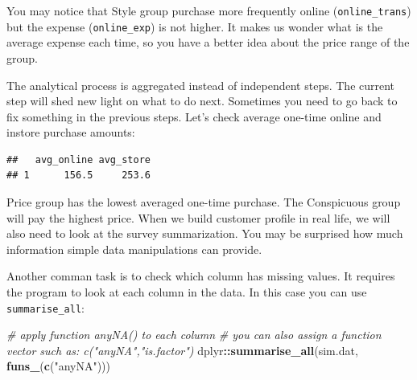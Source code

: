 \documentclass[12pt,]{krantz}
\makeatletter
\newenvironment{Shaded}{\begin{snugshade}}{\end{snugshade}}
\newcommand{\CommentTok}[1]{\textcolor[rgb]{0.37,0.37,0.37}{\textit{#1}}}
\newcommand{\DataTypeTok}[1]{\textcolor[rgb]{0.27,0.27,0.27}{#1}}
\newcommand{\DecValTok}[1]{\textcolor[rgb]{0.06,0.06,0.06}{#1}}
\newcommand{\KeywordTok}[1]{\textcolor[rgb]{0.27,0.27,0.27}{\textbf{#1}}}
\newcommand{\NormalTok}[1]{#1}
\newcommand{\OperatorTok}[1]{\textcolor[rgb]{0.43,0.43,0.43}{\textbf{#1}}}
\newcommand{\StringTok}[1]{\textcolor[rgb]{0.5,0.5,0.5}{#1}}
\newenvironment{kframe}{%
\medskip{}
\setlength{\fboxsep}{.8em}
 \def\at@end@of@kframe{}%
 \ifinner\ifhmode%
  \def\at@end@of@kframe{\end{minipage}}%
  \begin{minipage}{\columnwidth}%
 \fi\fi%
 \def\FrameCommand##1{\hskip\@totalleftmargin \hskip-\fboxsep
 \colorbox{shadecolor}{##1}\hskip-\fboxsep
     \hskip-\linewidth \hskip-\@totalleftmargin \hskip\columnwidth}%
 \MakeFramed {\advance\hsize-\width
   \@totalleftmargin\z@ \linewidth\hsize
   \@setminipage}}%
 {\par\unskip\endMakeFramed%
 \at@end@of@kframe}
\renewenvironment{Shaded}{\begin{kframe}}{\end{kframe}}
\makeatother
\begin{document}
You may notice that Style group purchase more frequently online (\texttt{online\_trans}) but the expense (\texttt{online\_exp}) is not higher. It makes us wonder what is the average expense each time, so you have a better idea about the price range of the group.

The analytical process is aggregated instead of independent steps. The current step will shed new light on what to do next. Sometimes you need to go back to fix something in the previous steps. Let's check average one-time online and instore purchase amounts:

\begin{Shaded}
\end{Shaded}

\begin{verbatim}
##   avg_online avg_store
## 1      156.5     253.6
\end{verbatim}

Price group has the lowest averaged one-time purchase. The Conspicuous group will pay the highest price. When we build customer profile in real life, we will also need to look at the survey summarization. You may be surprised how much information simple data manipulations can provide.

Another comman task is to check which column has missing values. It requires the program to look at each column in the data. In this case you can use \texttt{summarise\_all}:

\begin{Shaded}
\begin{Highlighting}[]
\CommentTok{# apply function anyNA() to each column}
\CommentTok{# you can also assign a function vector such as: c("anyNA","is.factor")}
\NormalTok{dplyr}\OperatorTok{::}\KeywordTok{summarise_all}\NormalTok{(sim.dat, }\KeywordTok{funs_}\NormalTok{(}\KeywordTok{c}\NormalTok{(}\StringTok{"anyNA"}\NormalTok{)))}
\end{Highlighting}
\end{Shaded}
\end{document}
